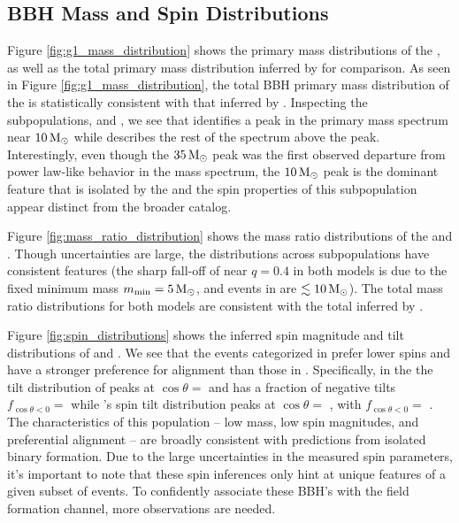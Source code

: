 \subsection{BBH Mass and Spin Distributions}

Figure \ref{fig:g1_mass_distribution} shows the primary mass distributions of the \base{}, as well as the total primary mass distribution inferred by \brucepaper{} for comparison. As seen in Figure \ref{fig:g1_mass_distribution}, the total BBH primary mass distribution of the \base{} is statistically consistent with that inferred by \brucepaper{}. Inspecting the subpopulations, \first{} and \contB{}, we see that \first{} identifies a peak in the primary mass spectrum near $10{\,\rm M}_\odot$ while \contB{} describes the rest of the spectrum above the peak. Interestingly, even though the $35{\,\rm M}_\odot$ peak was the first observed departure from power law-like behavior in the mass spectrum, the $10{\,\rm M}_\odot$ peak is the dominant feature that is isolated by the \comp{} and the spin properties of this subpopulation appear distinct from the broader catalog.

Figure \ref{fig:mass_ratio_distribution} shows the mass ratio distributions of the \base{} and \comp{}. Though uncertainties are large, the distributions across subpopulations have consistent features (the sharp fall-off of \first{} near $q=0.4$ in both models is due to the fixed minimum mass $m_\text{min}=5{\,\rm M}_\odot$, and events in \first{} are $\lesssim10{\,\rm M}_\odot$). The total mass ratio distributions for both models are consistent with the total inferred by \brucepaper.

Figure \ref{fig:spin_distributions} shows the inferred spin magnitude and tilt distributions of \popA{} and \popB{}. We see that the events categorized in \popA{} prefer lower spins and have a stronger preference for alignment than those in \popB{}. Specifically, in the \base{} the tilt distribution of \popA{} peaks at $\cos{\theta}=$ \result{$\CIPlusMinus{\macros[CosTilt][Base][PeakA][max]}$} and has a fraction of negative tilts $f_{\cos{\theta} < 0} = $ \result{$\CIPlusMinus{\macros[CosTilt][Base][PeakA][negfrac]}$} while \popB{}'s spin tilt distribution peaks at $\cos{\theta}=$ \result{$\CIPlusMinus{\macros[CosTilt][Base][ContinuumB][max]}$}, with $f_{\cos{\theta} < 0} = $ \result{$\CIPlusMinus{\macros[CosTilt][Base][ContinuumB][negfrac]}$}. The characteristics of this population -- low mass, low spin magnitudes, and preferential alignment -- are broadly consistent with predictions from isolated binary formation. Due to the large uncertainties in the measured spin parameters, it's important to note that these spin inferences only hint at unique features of a given subset of events. To confidently associate these BBH's with the field formation channel, more observations are needed.

